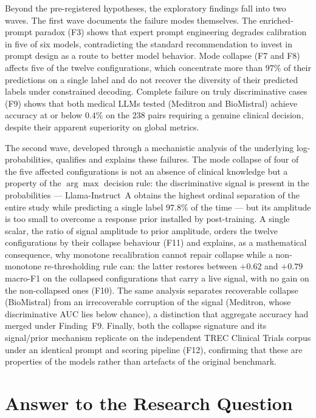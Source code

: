 Beyond the pre-registered hypotheses, the exploratory findings fall into 
two waves. The first wave documents the failure modes themselves. The 
enriched-prompt paradox (F3) shows that expert prompt engineering 
degrades calibration in five of six models, contradicting the standard 
recommendation to invest in prompt design as a route to better model 
behavior. Mode collapse (F7 and F8) affects five of the twelve 
configurations, which concentrate more than $97\%$ of their predictions 
on a single label and do not recover the diversity of their predicted 
labels under constrained decoding. Complete failure on truly 
discriminative cases (F9) shows that both medical LLMs tested (Meditron 
and BioMistral) achieve accuracy at or below $0.4\%$ on the $238$ pairs 
requiring a genuine clinical decision, despite their apparent 
superiority on global metrics.

The second wave, developed through a mechanistic analysis of the 
underlying log-probabilities, qualifies and explains these failures. The 
mode collapse of four of the five affected configurations is not an 
absence of clinical knowledge but a property of the $\arg\max$ decision 
rule: the discriminative signal is present in the probabilities --- 
Llama-Instruct~A obtains the highest ordinal separation of the entire 
study while predicting a single label $97.8\%$ of the time --- but its 
amplitude is too small to overcome a response prior installed by 
post-training. A single scalar, the ratio of signal amplitude to prior 
amplitude, orders the twelve configurations by their collapse behaviour 
(F11) and explains, as a mathematical consequence, why monotone 
recalibration cannot repair collapse while a non-monotone re-thresholding 
rule can: the latter restores between $+0.62$ and $+0.79$ macro-F1 on the 
collapsed configurations that carry a live signal, with no gain on the 
non-collapsed ones (F10). The same analysis separates recoverable 
collapse (BioMistral) from an irrecoverable corruption of the signal 
(Meditron, whose discriminative AUC lies below chance), a distinction 
that aggregate accuracy had merged under Finding~F9. Finally, both the 
collapse signature and its signal/prior mechanism replicate on the 
independent TREC Clinical Trials corpus under an identical prompt and 
scoring pipeline (F12), confirming that these are properties of the 
models rather than artefacts of the original benchmark.

\section{Answer to the Research Question}
\label{sec:conc-answer}

